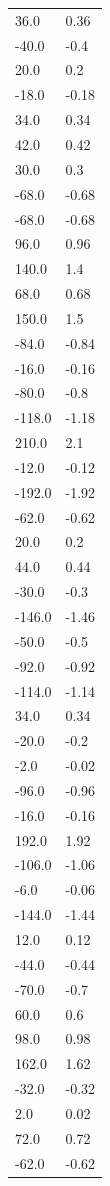 \begin{longtable}{ll}
36.0 & 0.36 \\
-40.0 & -0.4 \\
20.0 & 0.2 \\
-18.0 & -0.18 \\
34.0 & 0.34 \\
42.0 & 0.42 \\
30.0 & 0.3 \\
-68.0 & -0.68 \\
-68.0 & -0.68 \\
96.0 & 0.96 \\
140.0 & 1.4 \\
68.0 & 0.68 \\
150.0 & 1.5 \\
-84.0 & -0.84 \\
-16.0 & -0.16 \\
-80.0 & -0.8 \\
-118.0 & -1.18 \\
210.0 & 2.1 \\
-12.0 & -0.12 \\
-192.0 & -1.92 \\
-62.0 & -0.62 \\
20.0 & 0.2 \\
44.0 & 0.44 \\
-30.0 & -0.3 \\
-146.0 & -1.46 \\
-50.0 & -0.5 \\
-92.0 & -0.92 \\
-114.0 & -1.14 \\
34.0 & 0.34 \\
-20.0 & -0.2 \\
-2.0 & -0.02 \\
-96.0 & -0.96 \\
-16.0 & -0.16 \\
192.0 & 1.92 \\
-106.0 & -1.06 \\
-6.0 & -0.06 \\
-144.0 & -1.44 \\
12.0 & 0.12 \\
-44.0 & -0.44 \\
-70.0 & -0.7 \\
60.0 & 0.6 \\
98.0 & 0.98 \\
162.0 & 1.62 \\
-32.0 & -0.32 \\
2.0 & 0.02 \\
72.0 & 0.72 \\
-62.0 & -0.62 \\

\end{longtable}
